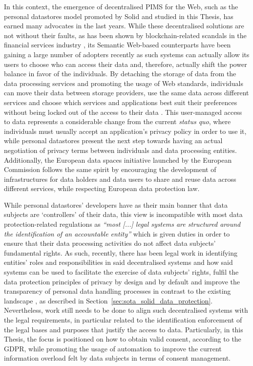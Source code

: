 In this context, the emergence of decentralised PIMS for the Web, such as the personal datastores model promoted by Solid and studied in this Thesis, has earned many advocates in the last years.
While these decentralised solutions are not without their faults, as has been shown by blockchain-related scandals in the financial services industry \citep{zetzsche_ico_2019}, its Semantic Web-based counterparts have been gaining a large number of adopters recently as such systems can actually allow its users to choose who can access their data and, therefore, actually shift the power balance in favor of the individuals.
By detaching the storage of data from the data processing services and promoting the usage of Web standards, individuals can move their data between storage providers, use the same data across different services and choose which services and applications best suit their preferences without being locked out of the access to their data \citep{verbrugge_towards_2021}.
This user-managed access to data represents a considerable change from the current \textit{status quo}, where individuals must usually accept an application's privacy policy in order to use it, while personal datastores present the next step towards having an actual negotiation of privacy terms between individuals and data processing entities.
Additionally, the European data spaces initiative launched by the European Commission \citep{european_commission_communication_2020} follows the same spirit by encouraging the development of infrastructures for data holders and data users to share and reuse data across different services, while respecting European data protection law.

While personal datastores' developers have as their main banner that data subjects are `controllers' of their data, this view is incompatible with most data protection-related regulations as \textit{``most [...] legal systems are structured around the identification of an accountable entity''} \citep{chomczyk_penedo_selfsovereign_2021} which is given duties in order to ensure that their data processing activities do not affect data subjects' fundamental rights.
As such, recently, there has been legal work in identifying entities' roles and responsibilities in said decentralised systems and how said systems can be used to facilitate the exercise of data subjects' rights, fulfil the data protection principles of privacy by design and by default and improve the transparency of personal data handling processes in contrast to the existing landscape \cite{janssen_personal_2020}, as described in Section~\ref{sec:sota_solid_data_protection}.
Nevertheless, work still needs to be done to align such decentralised systems with the legal requirements, in particular related to the identification enforcement of the legal bases and purposes that justify the access to data.  
Particularly, in this Thesis, the focus is positioned on how to obtain valid consent, according to the GDPR, while promoting the usage of automation to improve the current information overload felt by data subjects in terms of consent management.
